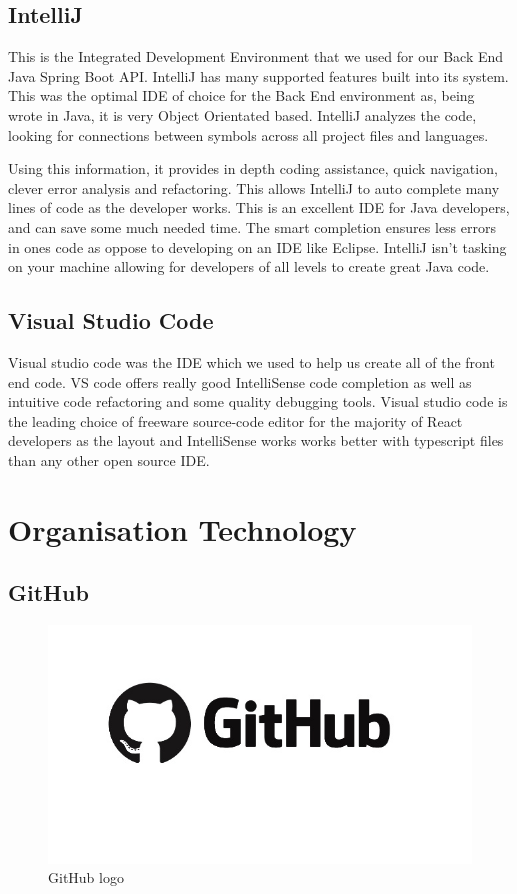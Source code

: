 \subsection{IntelliJ}
This is the Integrated Development Environment that we used for our Back End Java Spring Boot API. IntelliJ has many supported features built into its system. This was the optimal IDE of choice for the Back End environment as, being wrote in Java, it is very Object Orientated based. IntelliJ analyzes the code, looking for connections between symbols across all project files and languages.\par
Using this information, it provides in depth coding assistance, quick navigation, clever error analysis and refactoring. This allows IntelliJ to auto complete many lines of code as the developer works. This is an excellent IDE for Java developers, and can save some much needed time. The smart completion ensures less errors in ones code as oppose to developing on an IDE like Eclipse. IntelliJ isn't tasking on your machine allowing for developers of all levels to create great Java code.

\subsection{Visual Studio Code}
Visual studio code was the IDE which we used to help us create all of the front end code. VS code offers really good IntelliSense code completion as well as intuitive code refactoring and some quality debugging tools. Visual studio code is the leading choice of freeware source-code editor for the majority of React developers as the layout and IntelliSense works works better with typescript files than any other open source IDE.

\section{Organisation Technology}

\subsection{GitHub}
\begin{figure}[h]
\renewcommand\thefigure{3.14}
\centering
\includegraphics[scale=0.6]{img/github-logo.jpg}
\caption{GitHub logo}
\label{GithubLogo}
\end{figure}


